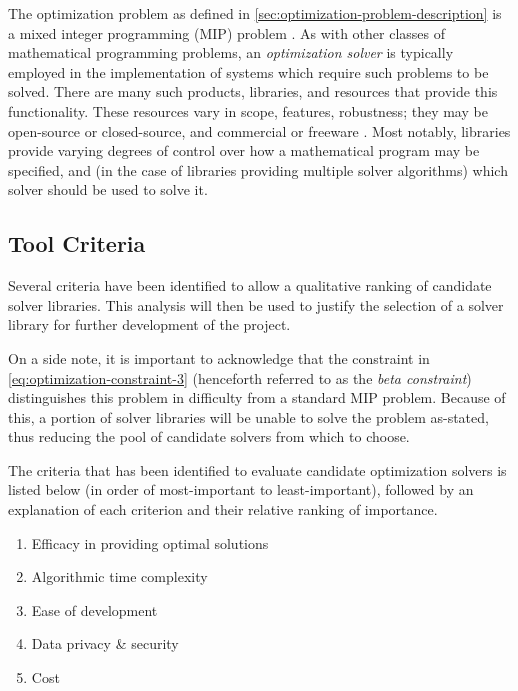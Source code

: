 \documentclass[../mthe-493-final-project.tex]{subfiles}
\begin{document}
    
    The optimization problem as defined in \autoref{sec:optimization-problem-description} is a mixed integer programming (MIP) problem \cite{wolsey_mip}. As with other classes of mathematical programming problems, an \textit{optimization solver} is typically employed in the implementation of systems which require such problems to be solved. There are many such products, libraries, and resources that provide this functionality. These resources vary in scope, features, robustness; they may be open-source or closed-source, and commercial or freeware \cite{greenberg_nature_2010}. Most notably, libraries provide varying degrees of control over how a mathematical program may be specified, and (in the case of libraries providing multiple solver algorithms) which solver should be used to solve it.
    
    \subsection{Tool Criteria}
    \label{ssec:optimization-tool-criteria}
    
    Several criteria have been identified to allow a qualitative ranking of candidate solver libraries. This analysis will then be used to justify the selection of a solver library for further development of the project.
    
    On a side note, it is important to acknowledge that the constraint in \eqref{eq:optimization-constraint-3} (henceforth referred to as the \textit{beta constraint}) distinguishes this problem in difficulty from a standard MIP problem. Because of this, a portion of solver libraries will be unable to solve the problem as-stated, thus reducing the pool of candidate solvers from which to choose.
    
    The criteria that has been identified to evaluate candidate optimization solvers is listed below (in order of most-important to least-important), followed by an explanation of each criterion and their relative ranking of importance.
    
    \begin{enumerate}
        \item Efficacy in providing optimal solutions
        \item Algorithmic time complexity
        \item Ease of development
        \item Data privacy \& security
        \item Cost
    \end{enumerate}
    
\end{document}
